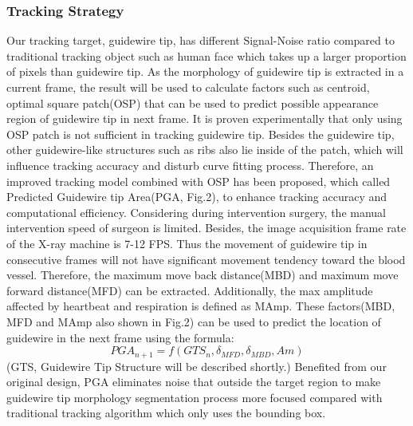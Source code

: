 \documentclass[journal]{IEEEtran}
\begin{document}
\subsubsection{Tracking Strategy} 
Our tracking target, guidewire tip, has different Signal-Noise ratio compared to traditional tracking object such as human face which takes up a larger proportion of pixels than guidewire tip. As the morphology of guidewire tip is extracted in a current frame, the result will be used to calculate factors such as centroid, optimal square patch(OSP) that can be used to predict possible appearance region of guidewire tip in next frame. It is proven experimentally that only using OSP patch is not sufficient in tracking guidewire tip. Besides the guidewire tip, other guidewire-like structures such as ribs also lie inside of the patch, which will influence tracking accuracy and disturb curve fitting process. Therefore, an improved tracking model combined with OSP has been proposed, which called Predicted Guidewire tip Area(PGA, Fig.2), to enhance tracking accuracy and computational efficiency. Considering during intervention surgery, the manual intervention speed of surgeon is limited. Besides, the image acquisition frame rate of the X-ray machine is 7-12 FPS. Thus the movement of guidewire tip in consecutive frames will not have significant movement tendency toward the blood vessel. Therefore, the maximum move back distance(MBD) and maximum move forward distance(MFD) can be extracted. Additionally, the max amplitude affected by heartbeat and respiration is defined as MAmp. These factors(MBD, MFD and MAmp also shown in Fig.2) can be used to predict the location of guidewire in the next frame using the formula: $$PGA_{n+1} = f(GTS_{n}, \delta_{MFD}, \delta_{MBD}, Am)$$ (GTS, Guidewire Tip Structure will be described shortly.)
Benefited from our original design, PGA eliminates noise that outside the target region to make guidewire tip morphology segmentation process more focused compared with traditional tracking algorithm which only uses the bounding box.
\end{document}
